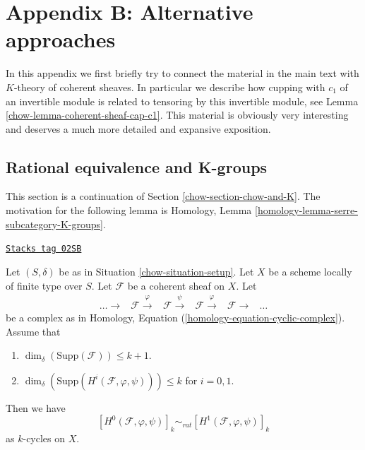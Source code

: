 \section{Appendix B: Alternative approaches}
\label{chow-section-appendix-chow}
In this appendix we first briefly try to connect the material
in the main text with $K$-theory of coherent sheaves. In
particular we describe how cupping with $c_1$ of an invertible
module is related to tensoring by this invertible module, see
Lemma \ref{chow-lemma-coherent-sheaf-cap-c1}.
This material is obviously very interesting and
deserves a much more detailed and expansive exposition.


\subsection{Rational equivalence and K-groups}
\label{chow-subsection-rational-equivalence-K-groups}

This section is a continuation of Section \ref{chow-section-chow-and-K}.
The motivation for the following lemma is
Homology, Lemma \ref{homology-lemma-serre-subcategory-K-groups}.

\begin{lemma}
\label{chow-lemma-maps-between-coherent-sheaves}
\href{https://stacks.math.columbia.edu/tag/02SB}{\texttt{Stacks tag 02SB}}

Let $(S, \delta)$ be as in Situation \ref{chow-situation-setup}.
Let $X$ be a scheme locally of finite type over $S$.
Let $\mathcal{F}$ be a coherent sheaf on $X$.
Let
$$
\begin{array}{cccccc}\ldots \longrightarrow & \mathcal{F} \overset{\varphi}{\longrightarrow} & \mathcal{F} \overset{\psi}{\longrightarrow} & \mathcal{F} \overset{\varphi}{\longrightarrow} & \mathcal{F} \longrightarrow & \ldots\end{array}
$$
be a complex as in Homology, Equation (\ref{homology-equation-cyclic-complex}).
Assume that
\begin{enumerate}
\item $\dim_\delta(\text{Supp}(\mathcal{F})) \leq k + 1$.
\item $\dim_\delta(\text{Supp}(H^i(\mathcal{F}, \varphi, \psi))) \leq k$
for $i = 0, 1$.
\end{enumerate}
Then we have
$$
[H^0(\mathcal{F}, \varphi, \psi)]_k
\sim_{rat}
[H^1(\mathcal{F}, \varphi, \psi)]_k
$$
as $k$-cycles on $X$.
\end{lemma}

